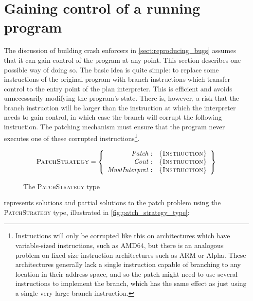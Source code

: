 \chapter{Gaining control of a running program}
\label{sect:enforce:gain_control}


The discussion of building crash enforcers in
\autoref{sect:reproducing_bugs} assumes that it can gain control of
the program at any point.  This section describes one possible way of
doing so.  The basic idea is quite simple: to replace some
instructions of the original program with branch instructions which
transfer control to the entry point of the plan interpreter.  This is
efficient and avoids unnecessarily modifying the program's state.
There is, however, a risk that the branch instruction will be larger
than the instruction at which the interpreter needs to gain control,
in which case the branch will corrupt the following instruction.  The
patching mechanism must ensure that the program never executes one of
these corrupted instructions\footnote{Instructions will only be
  corrupted like this on architectures which have variable-sized
  instructions, such as AMD64, but there is an analogous problem on
  fixed-size instruction architectures such as ARM or Alpha.  These
  architectures generally lack a single instruction capable of
  branching to any location in their address space, and so the patch
  might need to use several instructions to implement the branch,
  which has the same effect as just using a single very large branch
  instruction.}.

\begin{figure}[tp]
  \begin{displaymath}
    \textsc{PatchStrategy} = \left\{\begin{array}{rl}
    \mathit{Patch}: & \{\textsc{Instruction}\} \\
    \mathit{Cont}: & \{\textsc{Instruction}\} \\
    \mathit{MustInterpret}: & \{\textsc{Instruction}\}
    \end{array}\right\}
  \end{displaymath}
  \vspace{-12pt}
  \caption{The \textsc{PatchStrategy} type}
  \label{fig:patch_strategy_type}
\end{figure}

{\Implementation} represents solutions and partial solutions to the
patch problem using the \textsc{PatchStrategy} type, illustrated in
\autoref{fig:patch_strategy_type}:

